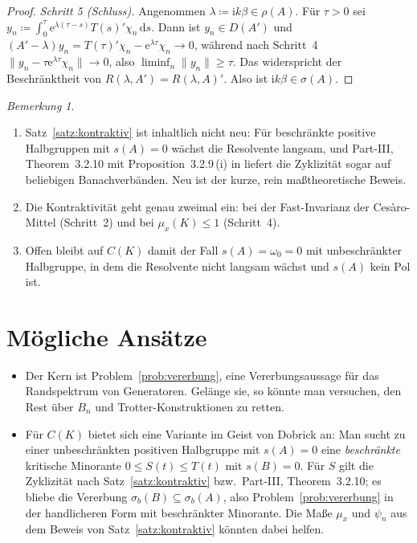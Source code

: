 \documentclass[11pt,a4paper]{article}
\theoremstyle{remark}
\newtheorem{bemerkung}[satz]{Bemerkung}
\theoremstyle{definition}
\newcommand{\eu}{\mathrm{e}}
\newcommand{\im}{\mathrm{i}}
\begin{document}
\begin{proof}
\emph{Schritt 5 (Schluss).}
Angenommen $\lambda \coloneqq \im k\beta \in \rho(A)$.
Für $\tau > 0$ sei $y_n \coloneqq \int_0^\tau \eu^{\lambda(\tau - s)}T(s)'\chi_n\,\mathrm{d}s$.
Dann ist $y_n \in D(A')$ und $(A' - \lambda)y_n = T(\tau)'\chi_n - \eu^{\lambda\tau}\chi_n \to 0$, während nach Schritt~4 $\|y_n - \tau\eu^{\lambda\tau}\chi_n\| \to 0$, also $\liminf_n \|y_n\| \ge \tau$.
Das widerspricht der Beschränktheit von $R(\lambda, A') = R(\lambda, A)'$.
Also ist $\im k\beta \in \sigma(A)$.
\end{proof}

\begin{bemerkung}
\begin{enumerate}[label=(\alph*)]
\item Satz~\ref{satz:kontraktiv} ist inhaltlich nicht neu: Für beschränkte positive Halbgruppen mit $s(A) = 0$ wächst die Resolvente langsam, und Part-III, Theorem~3.2.10 mit Proposition~3.2.9\,(i) in \cite{ln} liefert die Zyklizität sogar auf beliebigen Banachverbänden.
Neu ist der kurze, rein maßtheoretische Beweis.
\item Die Kontraktivität geht genau zweimal ein: bei der Fast-Invarianz der Cesàro-Mittel (Schritt~2) und bei $\mu_x(K) \le 1$ (Schritt~4).
\item Offen bleibt auf $C(K)$ damit der Fall $s(A) = \omega_0 = 0$ mit unbeschränkter Halbgruppe, in dem die Resolvente nicht langsam wächst und $s(A)$ kein Pol ist.
\end{enumerate}
\end{bemerkung}

\section{Mögliche Ansätze}

\begin{itemize}
\item Der Kern ist Problem~\ref{prob:vererbung}, eine Vererbungsaussage für das Randspektrum von Generatoren.
Gelänge sie, so könnte man versuchen, den Rest über $B_n$ und Trotter-Konstruktionen zu retten.
\item Für $C(K)$ bietet sich eine Variante im Geist von Dobrick an: Man sucht zu einer unbeschränkten positiven Halbgruppe mit $s(A) = 0$ eine \emph{beschränkte} kritische Minorante $0 \le S(t) \le T(t)$ mit $s(B) = 0$.
Für $S$ gilt die Zyklizität nach Satz~\ref{satz:kontraktiv} bzw.\ Part-III, Theorem~3.2.10; es bliebe die Vererbung $\sigma_b(B) \subseteq \sigma_b(A)$, also Problem~\ref{prob:vererbung} in der handlicheren Form mit beschränkter Minorante.
Die Maße $\mu_x$ und $\psi_n$ aus dem Beweis von Satz~\ref{satz:kontraktiv} könnten dabei helfen.
\end{itemize}
\end{document}
